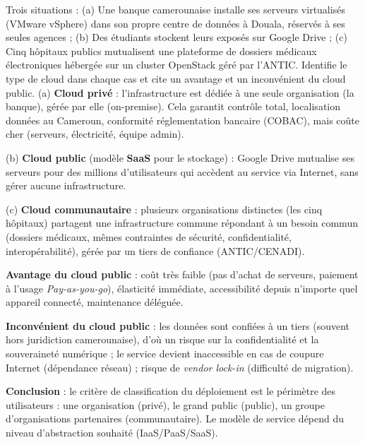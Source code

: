 \documentclass[11pt]{article}
\begin{document}
\begin{exoresolu}
Trois situations : 
(a) Une banque camerounaise installe ses serveurs virtualisés (VMware vSphere) dans son propre centre de données à Douala, réservés à ses seules agences ; 
(b) Des étudiants stockent leurs exposés sur Google Drive ; 
(c) Cinq hôpitaux publics mutualisent une plateforme de dossiers médicaux électroniques hébergée sur un cluster OpenStack géré par l'ANTIC. 
Identifie le type de cloud dans chaque cas et cite un avantage et un inconvénient du cloud public.
\tcblower
(a) \textbf{Cloud privé} : l'infrastructure est dédiée à une seule organisation (la banque), gérée par elle (on-premise). Cela garantit contrôle total, localisation données au Cameroun, conformité réglementation bancaire (COBAC), mais coûte cher (serveurs, électricité, équipe admin).

(b) \textbf{Cloud public} (modèle \textbf{SaaS} pour le stockage) : Google Drive mutualise ses serveurs pour des millions d'utilisateurs qui accèdent au service via Internet, sans gérer aucune infrastructure.

(c) \textbf{Cloud communautaire} : plusieurs organisations distinctes (les cinq hôpitaux) partagent une infrastructure commune répondant à un besoin commun (dossiers médicaux, mêmes contraintes de sécurité, confidentialité, interopérabilité), gérée par un tiers de confiance (ANTIC/CENADI).

\textbf{Avantage du cloud public} : coût très faible (pas d'achat de serveurs, paiement à l'usage \emph{Pay-as-you-go}), élasticité immédiate, accessibilité depuis n'importe quel appareil connecté, maintenance déléguée.

\textbf{Inconvénient du cloud public} : les données sont confiées à un tiers (souvent hors juridiction camerounaise), d'où un risque sur la confidentialité et la souveraineté numérique ; le service devient inaccessible en cas de coupure Internet (dépendance réseau) ; risque de \emph{vendor lock-in} (difficulté de migration).

\textbf{Conclusion} : le critère de classification du déploiement est le périmètre des utilisateurs : une organisation (privé), le grand public (public), un groupe d'organisations partenaires (communautaire). Le modèle de service dépend du niveau d'abstraction souhaité (IaaS/PaaS/SaaS).
\end{exoresolu}
\end{document}
